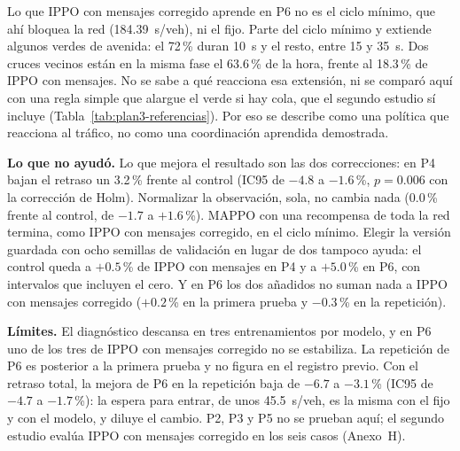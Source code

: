 Lo que IPPO con mensajes corregido aprende en P6 no es el ciclo mínimo,
que ahí bloquea la red (184.39~s/veh), ni el fijo. Parte del ciclo mínimo y extiende
algunos verdes de avenida: el 72\,\% duran 10~s y el resto, entre 15 y
35~s. Dos cruces vecinos están en la misma fase el 63.6\,\% de la hora,
frente al 18.3\,\% de IPPO con mensajes. No se sabe a qué reacciona esa
extensión, ni se comparó aquí con una regla simple que alargue el verde
si hay cola, que el segundo estudio sí incluye
(Tabla~\ref{tab:plan3-referencias}). Por eso se describe como una
política que reacciona al tráfico, no como una coordinación aprendida
demostrada.

\textbf{Lo que no ayudó.} Lo que mejora el resultado son las dos
correcciones: en P4 bajan el retraso un 3.2\,\% frente al control (IC95
de $-4.8$ a $-1.6$\,\%, $p = 0.006$ con la corrección de Holm).
Normalizar la observación, sola, no cambia nada ($0.0$\,\% frente al
control, de $-1.7$ a $+1.6$\,\%). MAPPO con una recompensa de toda la
red termina, como IPPO con mensajes corregido, en el ciclo mínimo. Elegir la
versión guardada con ocho semillas de validación en lugar de dos tampoco
ayuda: el control queda a $+0.5$\,\% de IPPO con mensajes en P4 y a
$+5.0$\,\% en P6, con intervalos que incluyen el cero. Y en P6 los dos
añadidos no suman nada a IPPO con mensajes corregido ($+0.2$\,\% en la
primera prueba y $-0.3$\,\% en la repetición).

\textbf{Límites.} El diagnóstico descansa en tres entrenamientos por
modelo, y en P6 uno de los tres de IPPO con mensajes corregido no se
estabiliza. La repetición de P6 es posterior a la primera prueba y no
figura en el registro previo. Con el retraso total, la mejora de P6 en
la repetición baja de $-6.7$ a $-3.1$\,\% (IC95 de $-4.7$ a
$-1.7$\,\%): la espera para entrar, de unos 45.5~s/veh, es la misma con
el fijo y con el modelo, y diluye el cambio. P2, P3 y P5 no se prueban
aquí; el segundo estudio evalúa IPPO con mensajes corregido en los seis
casos (Anexo~H).

